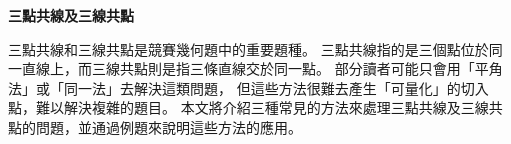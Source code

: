 \documentclass[12pt]{article}
\begin{document}
\thispagestyle{fancy}  %
\begin{center}
    \textbf{\Large{三點共線及三線共點}}
\end{center}
三點共線和三線共點是競賽幾何題中的重要題種。
三點共線指的是三個點位於同一直線上，而三線共點則是指三條直線交於同一點。
部分讀者可能只會用「平角法」或「同一法」去解決這類問題，
但這些方法很難去產生「可量化」的切入點，難以解決複雜的題目。
本文將介紹三種常見的方法來處理三點共線及三線共點的問題，並通過例題來說明這些方法的應用。

\begin{quotation}
    \centering
\end{quotation}
\end{document}
